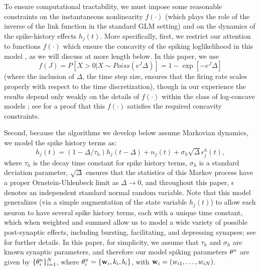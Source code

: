 To ensure computational tractability, we must impose some reasonable
constraints on the instantaneous nonlinearity $f(\cdot)$ (which plays
the role of the inverse of the link function in the standard GLM
setting) and on the dynamics of the spike-history effects $h_j(t)$.
More specifically, first, we restrict our attention to functions
$f(\cdot)$ which ensure the concavity of the spiking loglikelihood in
this model \cite{PAN04c}, as we will discuss at more length below.  In
this paper, we use
\begin{equation}
  f(J) = P[X>0 | X \sim Poiss(e^J \Delta)] = 1 - \exp[-e^J \Delta]
\end{equation}
(where the inclusion of $\Delta$, the time step size, ensures that the
firing rate scales properly with respect to the time discretization),
though in our experience the results depend only weakly on the details
of $f(\cdot)$ within the class of log-concave models
\cite{LD89,PAN04c}; see \cite{Escola07} for a proof that this
$f(\cdot)$ satisfies the required concavity constraints.

Second, because the algorithms we develop below assume Markovian
dynamics, we model the spike history terms as:
\begin{equation} \label{eqn:h:definition}
h_j(t) = (1- \Delta/\tau_h) h_j(t- \Delta) +n_j(t) + \sigma_h
\sqrt{\Delta} \epsilon^h_j(t),
\end{equation}
where $\tau_h$ is the decay time constant for spike history terms,
$\sigma_h$ is a standard deviation parameter, $\sqrt{\Delta}$ ensures
that the statistics of this Markov process have a proper
Ornstein-Uhlenbeck limit as $\Delta \to 0$, and throughout this paper,
$\epsilon$ denotes an independent standard normal random variable.
Note that this model generalizes (via a simple augmentation of the
state variable $h_j(t)$) to allow each neuron to have several spike
history terms, each with a unique time constant, which when weighted
and summed allow us to model a wide variety of possible post-synaptic
effects, including bursting, facilitating, and depressing synapses;
see \cite{Vogelstein2009} for further details.  In this paper, for
simplicity, we assume that $\tau_h$ and $\sigma_h$ are known synaptic
parameters, and therefore our model spiking parameters $\mathbf{\theta}^n$ are
given by $\{\mathbf{\theta}^n_i\}_{i=1}^N$, where $\mathbf{\theta}^n_i=\{\mathbf{w}_i,k_i,b_i\}$,
with $\mathbf{w}_i=(w_{i1},\ldots, w_{iN})$.

